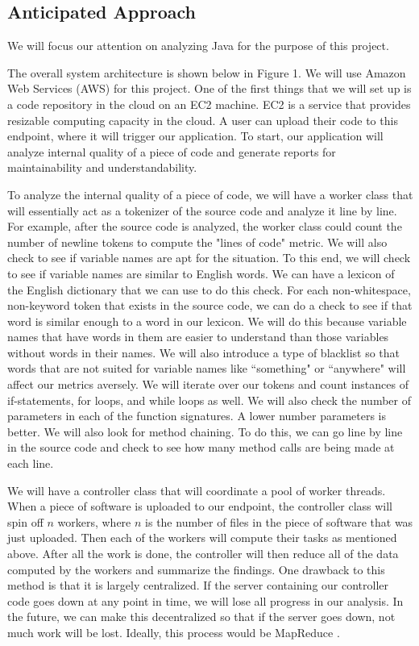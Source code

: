 \documentclass{sig-alternate}
\begin{document}
\subsection{Anticipated Approach}
\label{subsec:approach}
We will focus our attention on analyzing Java for the purpose of this project. 

The overall system architecture is shown below in Figure 1. We will use Amazon Web Services (AWS) for this project. One of the first things that we will set up is a code repository in the cloud on an EC2 machine. EC2 is a service that provides resizable computing capacity in the cloud. A user can upload their code to this endpoint, where it will trigger our application. To start, our application will analyze internal quality of a piece of code and generate reports for maintainability and understandability. 

To analyze the internal quality of a piece of code, we will have a worker class that will essentially act as a tokenizer of the source code and analyze it line by line. For example, after the source code is analyzed, the worker class could count the number of newline tokens to compute the "lines of code" metric. We will also check to see if variable names are apt for the situation. To this end, we will check to see if variable names are similar to English words. We can have a lexicon of the English dictionary that we can use to do this check. For each non-whitespace, non-keyword token that exists in the source code, we can do a check to see if that word is similar enough to a word in our lexicon. We will do this because variable names that have words in them are easier to understand than those variables without words in their names. We will also introduce a type of blacklist so that words that are not suited for variable names like ``something" or ``anywhere" will affect our metrics aversely. We will iterate over our tokens and count instances of if-statements, for loops, and while loops as well. We will also check the number of parameters in each of the function signatures. A lower number parameters is better.  We will also look for method chaining. To do this, we can go line by line in the source code and check to see how many method calls are being made at each line. 

We will have a controller class that will coordinate a pool of worker threads. When a piece of software is uploaded to our endpoint, the controller class will spin off $n$ workers, where $n$ is the number of files in the piece of software that was just uploaded. Then each of the workers will compute their tasks as mentioned above. After all the work is done, the controller will then reduce all of the data computed by the workers and summarize the findings. One drawback to this method is that it is largely centralized. If the server containing our controller code goes down at any point in time, we will lose all progress in our analysis. In the future, we can make this decentralized so that if the server goes down, not much work will be lost. Ideally, this process would be MapReduce \cite{dean2008mapreduce}.
\end{document}
